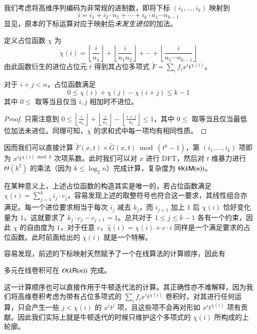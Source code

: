 我们考虑将高维序列编码为非常规的进制数，即将下标 $(i_1,\dots,i_k)$ 映射到
$$
i = i_1 + i_2\cdot n_1 + \cdots + i_k \cdot n_1\cdots n_{k-1}
$$
显见，原本的下标运算对应于映射后\emph{未发生进位}的加法。

\begin{definition}[进位占位元]
定义占位函数 $\chi$ 为
$$
\chi(i) = \left\lfloor \frac{i}{n_1}\right\rfloor + \left\lfloor \frac{i}{n_1n_2}\right\rfloor + \cdots + \left\lfloor \frac{i}{n_1\cdots n_{k-1}}\right\rfloor
$$
由此函数衍生的进位占位元 $t$ 得到其占位多项式 $\tilde F = \sum_i f_i x^i t^{\chi (i)}$。
\end{definition}

\begin{lemma}
对于 $i+j<n$，占位函数满足
$$
0\le \chi(i) + \chi(j) - \chi(i+j) \le k-1
$$
其中 $0\le $ 取等当且仅当 $i,j$ 相加时不进位。
\end{lemma}

\begin{proof}
只需注意到 $0\le \left\lfloor \frac{i}{n_1}\right\rfloor + \left\lfloor \frac{j}{n_1}\right\rfloor - \left\lfloor \frac{i+j}{n_1}\right\rfloor\le 1$，其中 $0\le $ 取等当且仅当最低位加法未进位。同理可知，$\chi$ 的求和式中每一项均有相同性质。
\end{proof}

因而我们可以直接计算 $\tilde F(x,t) \times \tilde G(x, t) \bmod (t^k-1)$，第 $(i_1,\dots,i_k)$ 项即为 $x^it^{\chi(i)\bmod k}$ 次项系数。此时我们可以对 $x$ 进行 DFT，然后对 $t$ 维暴力进行 $\Theta(k^2)$ 的乘法（因为 $k\le \log_2 n$）完成计算，复杂度为 $\Theta(k\mathsf M(n))$。

在某种意义上，上述占位函数的构造其实是唯一的，若占位函数满足 $\chi(i) = \sum_{j=1}^k i_j \cdot c_j$，容易发现上述的取整符号也符合这一要求，其线性组合亦满足。每一个进位要求相当于每次 $i_j$ 减去 $k_j$，而 $i_{j+1}$ 加上 $1$ 后 $\chi(i)$ 恰好变化量为 $1$，这就要求了 $k_j\cdot c_j - c_{j+1} = 1$。总共对于 $1\le j\le k-1$ 各有一个约束，因此 $\chi$ 的自由度为 $1$，对于任意 $c$，$\widehat \chi(i) = \chi(i) + c \cdot i$ 同样是一个满足要求的占位函数。此时前面给出的 $\chi(i)$ 就是一个特解。

容易发现，前述的下标映射天然赋予了一个在线算法的计算顺序，因此有

\begin{lemma}
多元在线卷积可在 $O(k\mathsf R(n))$ 完成。
\end{lemma}

这一计算顺序也可以直接作用于牛顿迭代法的计算。其正确性亦不难解释，因为我们将高维卷积考虑为带有占位多项式的 $\sum_i f_i x^i t^{\chi(i)}$ 卷积时，对其进行任何运算，只会产生一些 $j < \chi(i)$ 的 $x^it^j$ 项，且这些项不会再对形如 $x^it^{\chi(i)}$ 项有贡献。因此我们实际上就是牛顿迭代的时候只维护这个多项式的 $\chi(i)$ 所构成的上轮廓。

